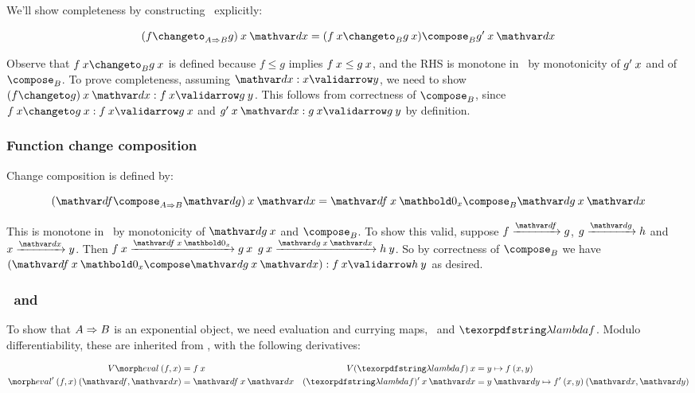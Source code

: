 We'll show completeness by constructing \changetofn\ explicitly:

\nopagebreak[2]
\[ (f \changeto_{\expO A B} g) \<x \<\dx = (f\<x \changeto_B g\<x) \compose_B \deriv g\<x\<\dx\]

\noindent Observe that $f\<x \changeto_B g\<x$ is defined because $f \le g$
implies $f\<x \le g\<x$, and the RHS is monotone in \dx\ by monotonicity of
$\deriv g \<x$ and of $\composefn_B$.
%
To prove completeness, assuming $\valid\dx x y$, we need to show \( \valid{(f
  \changeto g) \<x \<\dx}{f\<x}{g\<y} \). This follows from correctness of
$\composefn_B$, since \( \valid{f\<x \changeto g\<x}{f\<x}{g\<x} \) and
\(\valid{\deriv g \<x \<\dx}{g\<x}{g\<y}\) by definition.

\subsubsection{Function change composition}

Change composition is defined by:

\nopagebreak[2]
\[ (\df \compose_{\expO A B} \dg) \<x \<\dx = \df \<x \<\zero_x \compose_B \dg \<x \<\dx\]

\noindent
This is monotone in \dx\ by monotonicity of $\dg\<x$ and $\composefn_B$. To show
this valid, suppose $\vld\df f g$, $\vld\dg g h$ and $\vld\dx x y$. Then
%
\(\vld{\df\<x\<\zero_x}{f\<x}{g\<x}\)
\(\vld{\dg\<x\<\dx}{g\<x}{h\<y} \).
%
\noindent So by correctness of $\composefn_B$ we have \(\valid{(\df\<x\<\zero_x
  \compose \dg\<x\<\dx)}{f\<x}{h\<y}\) as desired.


\subsubsection{\eval\ and \fn}

To show that $A \Rightarrow B$ is an exponential object, we need evaluation and
currying maps, \eval\ and $\fn f$. Modulo differentiability, these are
inherited from \Poset{}, with the following derivatives:

\begin{align*}
  \vals{\eval} \<(f,x) &= f\<x &
  \vals{(\fn f)} \<x &= y \mapsto f\<(x,y)\\
  \deriv{\eval} \<(f,x) \<(\df,\dx) &= \df \<x \<\dx &
  \deriv{(\fn f)} \<x \<\dx &= y\<\dy \mapsto \deriv f \<(x,y) \<(\dx,\dy)
\end{align*}

